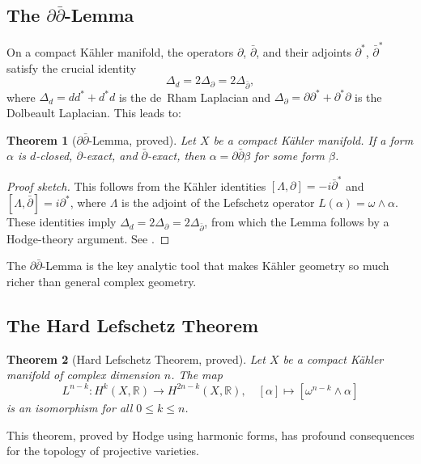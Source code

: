 \documentclass[12pt,a4paper]{amsart}
\newtheorem{theorem}{Theorem}[section]
\theoremstyle{definition}
\theoremstyle{remark}
\begin{document}
\subsection{The \texorpdfstring{$\partial\bar\partial$}{deldel-bar}-Lemma}

On a compact Kähler manifold, the operators $\partial$, $\bar\partial$, and their
adjoints $\partial^*$, $\bar\partial^*$ satisfy the crucial identity
\[
  \Delta_d = 2\Delta_\partial = 2\Delta_{\bar\partial},
\]
where $\Delta_d = dd^* + d^*d$ is the de~Rham Laplacian and $\Delta_\partial =
\partial\partial^* + \partial^*\partial$ is the Dolbeault Laplacian. This leads to:

\begin{theorem}[$\partial\bar\partial$-Lemma, proved]
\label{thm:ddbar}
Let $X$ be a compact Kähler manifold. If a form $\alpha$ is $d$-closed, $\partial$-exact,
and $\bar\partial$-exact, then $\alpha = \partial\bar\partial\beta$ for some form $\beta$.
\end{theorem}

\begin{proof}[Proof sketch]
This follows from the Kähler identities $[\Lambda, \partial] = -i\bar\partial^*$ and
$[\Lambda, \bar\partial] = i\partial^*$, where $\Lambda$ is the adjoint of the
Lefschetz operator $L(\alpha) = \omega \wedge \alpha$. These identities imply
$\Delta_d = 2\Delta_\partial = 2\Delta_{\bar\partial}$, from which the Lemma follows
by a Hodge-theory argument. See \cite[Ch.~6]{griffiths_harris1978}.
\end{proof}

The $\partial\bar\partial$-Lemma is the key analytic tool that makes Kähler geometry
so much richer than general complex geometry.

\subsection{The Hard Lefschetz Theorem}

\begin{theorem}[Hard Lefschetz Theorem, proved]
\label{thm:hard-lefschetz}
Let $X$ be a compact Kähler manifold of complex dimension $n$. The map
\[
  L^{n-k} : H^k(X,\mathbb{R}) \longrightarrow H^{2n-k}(X,\mathbb{R}),
  \quad [\alpha] \mapsto [\omega^{n-k} \wedge \alpha]
\]
is an isomorphism for all $0 \le k \le n$.
\end{theorem}

This theorem, proved by Hodge using harmonic forms, has profound consequences for
the topology of projective varieties.
\end{document}
